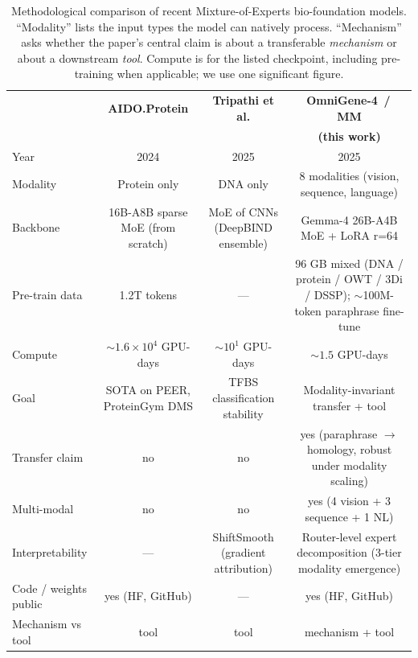 \begin{table}[t]
\centering
\small
\caption{Methodological comparison of recent Mixture-of-Experts bio-foundation
models. ``Modality'' lists the input types the model can natively process.
``Mechanism'' asks whether the paper's central claim is about a transferable
\emph{mechanism} or about a downstream \emph{tool}. Compute is for the listed
checkpoint, including pre-training when applicable; we use one significant
figure.}
\label{tab:t3-methodology}
\renewcommand{\arraystretch}{1.25}
\begin{tabular}{l c c c}
\toprule
& \textbf{AIDO.Protein} & \textbf{Tripathi et al.} & \textbf{OmniGene-4 \,/\, MM} \\
& \citep{sun2024aido} & \citep{tripathi2025tfbs} & \textbf{(this work)} \\
\midrule
Year                            & 2024            & 2025                & 2025 \\
Modality                        & Protein only    & DNA only            & 8 modalities (vision, sequence, language) \\
Backbone                        & 16B-A8B sparse MoE (from scratch) & MoE of CNNs (DeepBIND ensemble) & Gemma-4 26B-A4B MoE + LoRA r=64 \\
Pre-train data                  & 1.2T tokens     & ---                 & 96 GB mixed (DNA / protein / OWT / 3Di / DSSP); $\sim$100M-token paraphrase fine-tune \\
Compute                         & $\sim 1.6\!\times\!10^{4}$ GPU-days & $\sim 10^{1}$ GPU-days & $\sim 1.5$ GPU-days \\
Goal                            & SOTA on PEER, ProteinGym DMS & TFBS classification stability & Modality-invariant transfer + tool \\
Transfer claim                  & no              & no                  & yes (paraphrase $\rightarrow$ homology, robust under modality scaling) \\
Multi-modal                     & no              & no                  & yes (4 vision + 3 sequence + 1 NL) \\
Interpretability                & ---             & ShiftSmooth (gradient attribution) & Router-level expert decomposition (3-tier modality emergence) \\
Code / weights public           & yes (HF, GitHub) & ---                 & yes (HF, GitHub) \\
Mechanism vs tool               & tool            & tool                & mechanism + tool \\
\bottomrule
\end{tabular}
\end{table}

